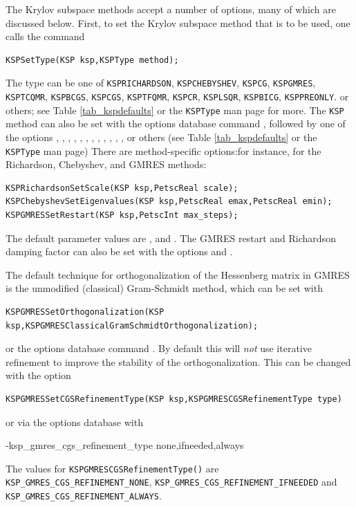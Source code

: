 The Krylov subspace methods accept a number of options, many of which
are discussed below.  First, to set the Krylov subspace method that is to
be used, one calls the command
\begin{lstlisting}
KSPSetType(KSP ksp,KSPType method);
\end{lstlisting}
The type can be one of \lstinline{KSPRICHARDSON}, \lstinline{KSPCHEBYSHEV}, \lstinline{KSPCG}, \lstinline{KSPGMRES},
\lstinline{KSPTCQMR}, \lstinline{KSPBCGS}, \lstinline{KSPCGS}, \lstinline{KSPTFQMR}, \lstinline{KSPCR}, \lstinline{KSPLSQR}, \lstinline{KSPBICG}, \lstinline{KSPPREONLY}. or others; see Table \ref{tab_kspdefaults} or the \lstinline{KSPType} man page for more.
The \lstinline{KSP} method can also be set with the options database command
,
followed by one of the options , , , , ,
, , , , , , , or others (see Table \ref{tab_kspdefaults} or the \lstinline{KSPType} man page) 
There are method-specific options:for instance, for the Richardson, Chebyshev,
and GMRES methods:  
\begin{lstlisting}
KSPRichardsonSetScale(KSP ksp,PetscReal scale);
KSPChebyshevSetEigenvalues(KSP ksp,PetscReal emax,PetscReal emin);
KSPGMRESSetRestart(KSP ksp,PetscInt max_steps);
\end{lstlisting}
The default parameter values are , 
and . The GMRES
 restart and Richardson damping factor
can also be set with the options 
and . 

The default technique for orthogonalization of the Hessenberg
matrix in GMRES is the
unmodified (classical) Gram-Schmidt method, which can be set 
with
\begin{lstlisting}
KSPGMRESSetOrthogonalization(KSP ksp,KSPGMRESClassicalGramSchmidtOrthogonalization);
\end{lstlisting}
or the options database 
command .
By default this will {\em not} use iterative refinement to improve the
stability of the orthogonalization.
This can be changed with the option
\begin{lstlisting}
KSPGMRESSetCGSRefinementType(KSP ksp,KSPGMRESCGSRefinementType type)
\end{lstlisting}
or via the options database with
\begin{bashlisting}
-ksp_gmres_cgs_refinement_type none,ifneeded,always
\end{bashlisting}
The values for \lstinline{KSPGMRESCGSRefinementType()} are \lstinline{KSP_GMRES_CGS_REFINEMENT_NONE},  \break
\lstinline{KSP_GMRES_CGS_REFINEMENT_IFNEEDED} and \lstinline{KSP_GMRES_CGS_REFINEMENT_ALWAYS}.
 

